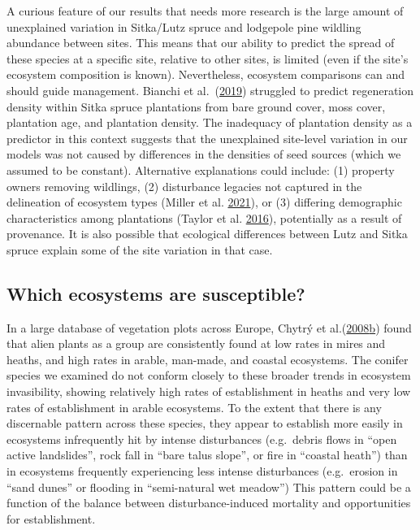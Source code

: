 \documentclass[
]{article}
\begin{document}
A curious feature of our results that needs more research is the large amount of unexplained variation in Sitka/Lutz spruce and lodgepole pine wildling abundance between sites.
This means that our ability to predict the spread of these species at a specific site, relative to other sites, is limited (even if the site's ecosystem composition is known).
Nevertheless, ecosystem comparisons can and should guide management.
Bianchi et al.~(\protect\hyperlink{ref-bianchiMethodsPredictingSitka2019}{2019}) struggled to predict regeneration density within Sitka spruce plantations from bare ground cover, moss cover, plantation age, and plantation density.
The inadequacy of plantation density as a predictor in this context suggests that the unexplained site-level variation in our models was not caused by differences in the densities of seed sources (which we assumed to be constant).
Alternative explanations could include: (1) property owners removing wildlings, (2) disturbance legacies not captured in the delineation of ecosystem types (Miller et al. \protect\hyperlink{ref-millerHowDisturbanceHistory2021}{2021}), or (3) differing demographic characteristics among plantations (Taylor et al. \protect\hyperlink{ref-taylorDriversPlantInvasion2016}{2016}), potentially as a result of provenance.
It is also possible that ecological differences between Lutz and Sitka spruce explain some of the site variation in that case.

\hypertarget{which-ecosystems-are-susceptible}{%
\subsection{Which ecosystems are susceptible?}\label{which-ecosystems-are-susceptible}}

In a large database of vegetation plots across Europe, Chytrý et al.(\protect\hyperlink{ref-chytryHabitatInvasionsAlien2008}{2008}\protect\hyperlink{ref-chytryHabitatInvasionsAlien2008}{b}) found that alien plants as a group are consistently found at low rates in mires and heaths, and high rates in arable, man-made, and coastal ecosystems.
The conifer species we examined do not conform closely to these broader trends in ecosystem invasibility, showing relatively high rates of establishment in heaths and very low rates of establishment in arable ecosystems.
To the extent that there is any discernable pattern across these species, they appear to establish more easily in ecosystems infrequently hit by intense disturbances (e.g.~debris flows in ``open active landslides'', rock fall in ``bare talus slope'', or fire in ``coastal heath'') than in ecosystems frequently experiencing less intense disturbances (e.g.~erosion in ``sand dunes'' or flooding in ``semi-natural wet meadow'')
This pattern could be a function of the balance between disturbance-induced mortality and opportunities for establishment.
\end{document}
